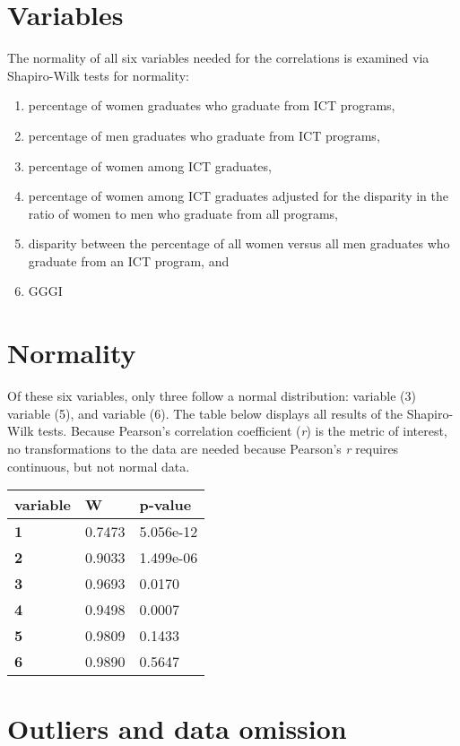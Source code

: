 \documentclass[]{book}
\providecommand{\tightlist}{%
  \setlength{\itemsep}{0pt}\setlength{\parskip}{0pt}}
\begin{document}
\section{Variables}\label{variables}

The normality of all six variables needed for the correlations is
examined via Shapiro-Wilk tests for normality:

\begin{enumerate}
\def\labelenumi{\arabic{enumi}.}
\tightlist
\item
  percentage of women graduates who graduate from ICT programs,
\item
  percentage of men graduates who graduate from ICT programs,
\item
  percentage of women among ICT graduates,
\item
  percentage of women among ICT graduates adjusted for the disparity in
  the ratio of women to men who graduate from all programs,
\item
  disparity between the percentage of all women versus all men graduates
  who graduate from an ICT program, and
\item
  GGGI
\end{enumerate}

\section{Normality}\label{normality}

Of these six variables, only three follow a normal distribution:
variable (3) variable (5), and variable (6). The table below displays
all results of the Shapiro-Wilk tests. Because Pearson's correlation
coefficient (\emph{r}) is the metric of interest, no transformations to
the data are needed because Pearson's \emph{r} requires continuous, but
not normal data.

\begin{longtable}[]{@{}lll@{}}
\toprule
variable & W & p-value\tabularnewline
\midrule
\endhead
\textbf{1} & 0.7473 & 5.056e-12\tabularnewline
\textbf{2} & 0.9033 & 1.499e-06\tabularnewline
\textbf{3} & 0.9693 & 0.0170\tabularnewline
\textbf{4} & 0.9498 & 0.0007\tabularnewline
\textbf{5} & 0.9809 & 0.1433\tabularnewline
\textbf{6} & 0.9890 & 0.5647\tabularnewline
\bottomrule
\end{longtable}

\section{Outliers and data omission}\label{outliers-and-data-omission}
\end{document}
